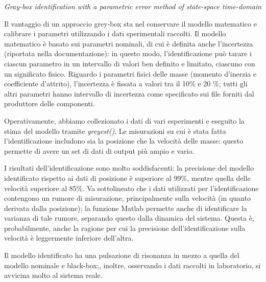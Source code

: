 \textit{Gray-box identification with a parametric error method of state-space time-domain}
\\ \par Il vantaggio di un approccio grey-box sta nel conservare il modello matematico e calibrare i parametri utilizzando i dati sperimentali raccolti. Il modello matematico è basato sui parametri nominali, di cui è definita anche l'incertezza (riportata nella documentazione): in questo modo, l'identificazione può tarare i ciascun parametro in un intervallo di valori ben definito e limitato, ciascuno con un significato fisico. Riguardo i parametri fisici delle masse (momento d'inerzia e coefficiente d'attrito), l'incertezza è fissata a valori tra il 10\% e 20 \%; tutti gli altri parametri hanno intervallo di incertezza come specificato sui file forniti dal produttore delle componenti.

Operativamente, abbiamo collezionato i dati di vari esperimenti e eseguito la stima del modello tramite \textit{greyest()}. Le misurazioni su cui è stata fatta l'identificazione includono sia la posizione che la velocità delle masse: questo permette di avere un set di dati di output più ampio e vario.

I risultati dell'identificazione sono molto soddisfacenti: la precisione del modello identificato rispetto ai dati di posizione è superiore al 99\%, mentre quella delle velocità superiore al 85\%. Va sottolineato che i dati utilizzati per l'identificazione contengono un rumore di misurazione, principalmente sulla velocità (in quanto derivata dalla posizione); la funzione Matlab permette anche di identificare la varianza di tale rumore, separando questo dalla dinamica del sistema. Questa è, probabilmente, anche la ragione per cui la precisione dell'identificazione sulla velocità è leggermente inferiore dell'altra.

Il modello identificato ha una pulsazione di risonanza in mezzo a quella del modello nominale e black-box;, inoltre, osservando i dati raccolti in laboratorio, si avvicina molto al sistema reale.

